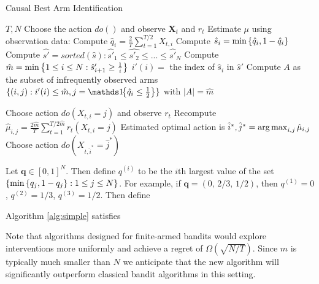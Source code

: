 \begin{algorithm}[h]
\caption{Causal Best Arm Identification}\label{alg:simple}
\begin{algorithmic}[1]
 $T, N$
\STATE Choose the action $do()$ and observe $\boldsymbol{X}_t$ and $r_t$
\ENDFOR
\STATE Estimate $\mu$ using observation data:
\STATE Compute $\hat q_i = \frac{2}{T} \sum_{t=1}^{T/2} X_{t,i}$
\STATE Compute $\hat s_i = \min\left\{\hat q_i, 1 - \hat q_i\right\}$
\STATE Compute $\hat{s'} = sorted(\hat{s}) : \hat{s'}_1 \leq \hat{s'_2} \leq ... \leq \hat{s'}_N$
\STATE Compute $\hat m = \min\left\{1 \leq i \leq N : \hat s'_{i+1} \geq \frac{1}{i}\right\}$
\STATE $i'(i) = $ the index of $\hat s_i$ in $\hat s'$
\STATE Compute $A$ as the subset of infrequently observed arms $\{(i,j):i'(i) \leq \hat m, j = \ind{\hat q_{i} \leq \frac{1}{2}} \}$ with $|A| = \hat m$

\STATE Choose action $do(X_{t,i} = j)$ and observe $r_t$
\ENDFOR
\STATE Recompute $\hat \mu_{i,j} = \frac{2\hat m}{T} \sum_{t=1}^{ T/2\hat m} r_t(X_{t,i}=j)$ 
\ENDFOR
\STATE Estimated optimal action is $\hat i^*, \hat j^* = \argmax_{i,j} \hat \mu_{i,j}$
\STATE Choose action $do(X_{t,\hat i^*} = \hat j^*)$
\end{algorithmic}
\end{algorithm}


\begin{definition}
Let $\boldsymbol{q} \in [0,1]^N$. Then define $q^{(i)}$ to be the $i$th largest value of the set $\left\{\min \left\{q_j, 1 - q_j\right\} : 1 \leq j \leq N\right\}$.
For example, if $\boldsymbol{q} = (0,\, 2/3,\, 1/2)$, then $q^{(1)} = 0$, $q^{(2)} = 1/3$, $q^{(3)} = 1/2$.
Then define 
\end{definition}

\begin{theorem}\label{thm:unknown_q_simpleregret}
Algorithm \ref{alg:simple} satisfies
\end{theorem}

Note that algorithms designed for finite-armed bandits would explore interventions more uniformly and achieve a regret of $\Omega(\sqrt{N/T})$.
Since $m$ is typically much smaller than $N$ we anticipate that the new algorithm will significantly outperform classical bandit algorithms in
this setting.


